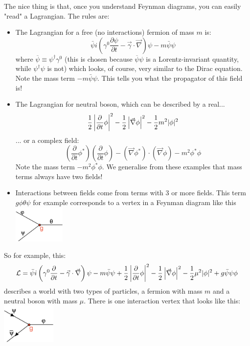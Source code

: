The nice thing is that, once you understand Feynman diagrams, you can easily "read" a Lagrangian. The rules are:
\begin{itemize}
\item The Lagrangian for a free (no interactions) fermion of mass $m$ is: 
\begin{equation}
\bar{\psi} i\left(\gamma^0\frac{\partial\psi}{\partial t}-\vec{\gamma}\cdot \vec{\nabla}\right)\psi
 - m \bar{\psi} \psi
\end{equation}
where $\overline\psi \equiv \psi^{\dagger} \gamma^0$ (this is chosen because $\overline{\psi}\psi$ is a Lorentz-invariant quantity, while $\psi^{\dagger}\psi$ is not) which looks, of course, very similar to the Dirac equation. Note the mass term $ - m \bar{\psi} \psi$. This tells you what the propagator of this field is!
\item The Lagrangian for neutral boson, which can be described by a real...
\begin{equation}
\frac{1}{2} \left|\frac{\partial}{\partial t} \phi \right|^2
-
\frac{1}{2} \left|\vec{\nabla}\phi\right|^2
 - \frac{1}{2} m^2|\phi|^2
\end{equation}
... or a complex field:
\begin{equation}
\label{eq:LagrangeComplex}
\left(\frac{\partial}{\partial t} \phi^{*} \right)
\left(\frac{\partial}{\partial t} \phi \right)
-
\left(\vec{\nabla}\phi^{*}\right) \cdot \left(\vec{\nabla}\phi\right)
 -m^2\phi^{*}\phi
\end{equation}
Note the mass term $ - m^2 \phi^*\phi$. We generalise from these examples that mass terms always have two fields!
\item Interactions between fields come from terms with 3 or more fields. This term $g \phi \theta \psi$ for example corresponds to a vertex in a Feynman diagram like this\\
\includegraphics[width=0.2\textwidth]{fig/Feynman3}
\end{itemize}
So for example, this:
\begin{equation}
\mathcal{L} = 
\bar{\psi} i\left(\gamma^0\frac{\partial}{\partial t}-\vec{\gamma}\cdot \vec{\nabla}\right)\psi  - m \bar{\psi} \psi
%
+
\half \left|\frac{\partial}{\partial t} \phi \right|^2
-
\half \left|\vec{\nabla}\phi\right|^2
 - \half \mu^2|\phi|^2
%
+ 
g \bar{\psi}\psi\phi
%
\end{equation}
describes a world with two types of particles, a fermion with mass $m$ and a neutral boson with mass $\mu$. There is one interaction vertex that looks like this:
\\\includegraphics[width=0.2\textwidth]{fig/psibarpsiVertex}\\

